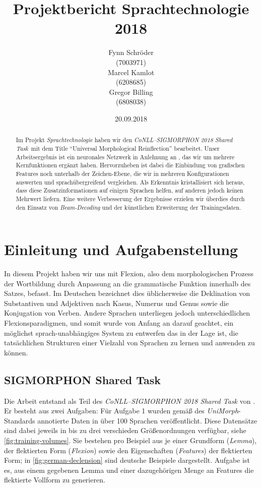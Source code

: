 \documentclass[11pt,a4paper]{article}
\title{Projektbericht Sprachtechnologie 2018}
\author{
Fynn Schröder\\
(7003971)
\\\And Marcel Kamlot\\
(6208685)
\\\And Gregor Billing\\
(6808038)}
\date{20.09.2018}
\newcommand{\prostst}[0]{\emph{CoNLL--SIGMORPHON 2018 Shared Task}}
\begin{document}
\maketitle
\pagestyle{plain}

\begin{abstract}
Im Projekt \textit{Sprachtechnologie} haben wir den \prostst~mit dem Title \enquote{Universal Morphological Reinflection} bearbeitet. Unser Arbeitsergebnis ist ein neuronales Netzwerk in Anlehnung an \citet{cluzh:MakarovRC17}, das wir um mehrere Kernfunktionen ergänzt haben. Hervorzuheben ist dabei die Einbindung von grafischen Features noch unterhalb der Zeichen-Ebene, die wir in mehreren Konfigurationen auswerten und sprachübergreifend vergleichen. Als Erkenntnis kristallisiert sich heraus, dass diese Zusatzinformationen auf einigen Sprachen helfen, auf anderen jedoch keinen Mehrwert liefern. Eine weitere Verbesserung der Ergebnisse erzielen wir überdies durch den Einsatz von \textit{Beam-Decoding} und der künstlichen Erweiterung der Trainingsdaten.
\end{abstract}

\section{Einleitung und Aufgabenstellung}
\label{sec:introduction}
In diesem Projekt haben wir uns mit Flexion, also dem morphologischen Prozess der Wortbildung durch Anpassung an die grammatische Funktion innerhalb des Satzes, befasst. Im Deutschen bezeichnet dies üblicherweise die Deklination von Substantiven und Adjektiven nach Kasus, Numerus und Genus sowie die Konjugation von Verben.
Andere Sprachen unterliegen jedoch unterschiedlichen Flexionsparadigmen, und somit wurde von Anfang an darauf geachtet, ein möglichst sprach-unabhängiges System zu entwerfen das in der Lage ist, die tatsächlichen Strukturen einer Vielzahl von Sprachen zu lernen und anwenden zu können.

\subsection{SIGMORPHON Shared Task}
\label{sec:sub:shared_task}
Die Arbeit entstand als Teil des \textit{CoNLL--SIGMORPHON 2018 Shared Task} von \citet{sigmorphon:st2018}. Er besteht aus zwei Aufgaben: Für Aufgabe 1 wurden gemäß des \textit{UniMorph}-Standards \citep{kirov:unimorph2018} annotierte Daten in über 100 Sprachen veröffentlicht. Diese Datensätze sind dabei jeweils in bis zu drei verschieden Größenordnungen verfügbar, siehe \autoref{fig:training-volumes}. Sie bestehen pro Beispiel aus je einer Grundform (\textit{Lemma}), der flektierten Form (\textit{Flexion}) sowie den Eigenschaften (\textit{Features}) der flektierten Form; in \autoref{fig:german-declension} sind deutsche Beispiele dargestellt. Aufgabe ist es, aus einem gegebenen Lemma und einer dazugehörigen Menge an Features die flektierte Vollform zu generieren.
\end{document}
